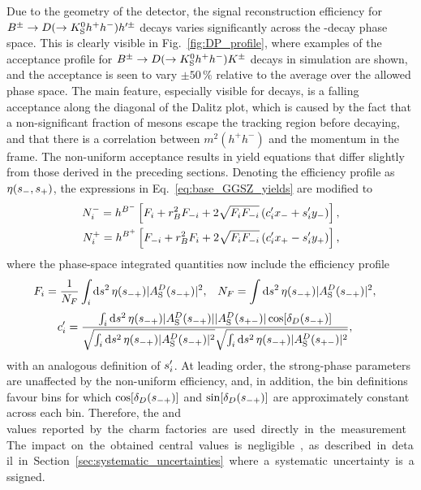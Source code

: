 Due to the geometry of the \lhcb detector, the signal reconstruction efficiency for ${{B}^\pm}\rightarrow{\ensuremath{D}}(\rightarrow{\ensuremath{{K}^0_{\mathrm{S}}}} h^+h^-)h'^\pm$ decays varies significantly across the \D-decay phase space. This is clearly visible in Fig.~\ref{fig:DP_profile}, where examples of the acceptance profile for  ${{B}^\pm}\rightarrow{\ensuremath{D}}(\rightarrow{\ensuremath{{K}^0_{\mathrm{S}}}} h^+h^-){{K}^\pm}$ decays in \lhcb simulation are shown, and the acceptance is seen to vary $\pm50\,\%$ relative to the average over the allowed phase space. The main feature, especially visible for \DtoKspipi decays, is a falling acceptance along the diagonal of the Dalitz plot, which is caused by the fact that a non-significant fraction of \KS mesons escape the \lhcb tracking region before decaying, and that there is a correlation between $m^2(h^+h^-)$ and the \KS momentum in the \lhcb frame. The non-uniform acceptance results in yield equations that differ slightly from those derived in the preceding sections. Denoting the efficiency profile as $\eta(s_-, s_+)$, the expressions in Eq.~\eqref{eq:base_GGSZ_yields} are modified to
\begin{align}
\begin{split}    \label{eq:lhcb_GGSZ_yields}
    N^-_i = h^{{{B}^-}} \left[F_i + r_{B}^2F_{-i} + 2\sqrt{F_iF_{-i}}\left(c_i'x_-+s_i'y_-\right)\right], \\
    N^+_i = h^{{{B}^+}} \left[F_{-i} + r_{B}^2F_i + 2\sqrt{F_iF_{-i}}\left(c_i'x_+-s_i'y_+\right)\right],
\end{split}
\end{align}
where the phase-space integrated quantities now include the efficiency profile
\begin{align}\label{eq:Fi_def}
    F_i &= \frac{1}{N_F}\int_i\text{d}s^2 \,\eta(s_{-+})|A_{\rm S}^{D}(s_{-+})|^2, &
    N_F &=\int\text{d}s^2 \,\eta(s_{-+})|A_{\rm S}^{D}(s_{-+})|^2,
\end{align}
\begin{align}\label{eq:ci_si_with_eff}
\begin{split}
    c_i' &= \frac
    {\int_i \text{d}s^2 \,\eta(s_{-+})|A_{\rm S}^{D}(s_{-+})||A_{\rm S}^{D}(s_{+-})|\cos[\delta_D(s_{-+})]}
    {\sqrt{\int_i \text{d}s^2 \,\eta(s_{-+})|A_{\rm S}^{D}(s_{-+})|^2}\sqrt{\int_i \text{d}s^2 \,\eta(s_{-+})|A_{\rm S}^{D}(s_{+-})|^2}},
\end{split}
\end{align}
with an analogous definition of $s_i'$. At leading order, the strong-phase parameters are unaffected by the non-uniform efficiency, and, in addition, the bin definitions favour bins for which $\cos[\delta_D(s_{-+})]$ and $\sin[\delta_D(s_{-+})]$ are approximately constant across each bin.  Therefore, the  \ci and \si values reported by the charm factories are used directly in the measurement. The impact on the obtained central values is negligible, as described in detail in Section~\ref{sec:systematic_uncertainties} where a systematic uncertainty is assigned. 

